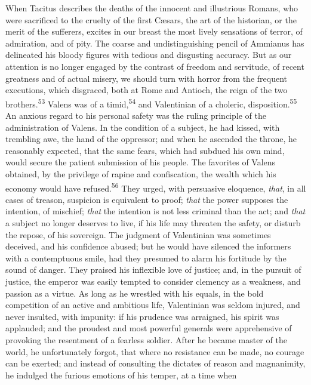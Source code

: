 When Tacitus describes the deaths of the innocent and illustrious
Romans, who were sacrificed to the cruelty of the first Cæsars,
the art of the historian, or the merit of the sufferers, excites
in our breast the most lively sensations of terror, of
admiration, and of pity. The coarse and undistinguishing pencil
of Ammianus has delineated his bloody figures with tedious and
disgusting accuracy. But as our attention is no longer engaged by
the contrast of freedom and servitude, of recent greatness and of
actual misery, we should turn with horror from the frequent
executions, which disgraced, both at Rome and Antioch, the reign
of the two brothers.\textsuperscript{53} Valens was of a timid,\textsuperscript{54} and Valentinian
of a choleric, disposition.\textsuperscript{55} An anxious regard to his personal
safety was the ruling principle of the administration of Valens.
In the condition of a subject, he had kissed, with trembling awe,
the hand of the oppressor; and when he ascended the throne, he
reasonably expected, that the same fears, which had subdued his
own mind, would secure the patient submission of his people. The
favorites of Valens obtained, by the privilege of rapine and
confiscation, the wealth which his economy would have refused.\textsuperscript{56}
They urged, with persuasive eloquence, \textit{that}, in all cases of
treason, suspicion is equivalent to proof; \textit{that} the power
supposes the intention, of mischief; \textit{that} the intention is not
less criminal than the act; and \textit{that} a subject no longer
deserves to live, if his life may threaten the safety, or disturb
the repose, of his sovereign. The judgment of Valentinian was
sometimes deceived, and his confidence abused; but he would have
silenced the informers with a contemptuous smile, had they
presumed to alarm his fortitude by the sound of danger. They
praised his inflexible love of justice; and, in the pursuit of
justice, the emperor was easily tempted to consider clemency as a
weakness, and passion as a virtue. As long as he wrestled with
his equals, in the bold competition of an active and ambitious
life, Valentinian was seldom injured, and never insulted, with
impunity: if his prudence was arraigned, his spirit was
applauded; and the proudest and most powerful generals were
apprehensive of provoking the resentment of a fearless soldier.
After he became master of the world, he unfortunately forgot,
that where no resistance can be made, no courage can be exerted;
and instead of consulting the dictates of reason and magnanimity,
he indulged the furious emotions of his temper, at a time when
